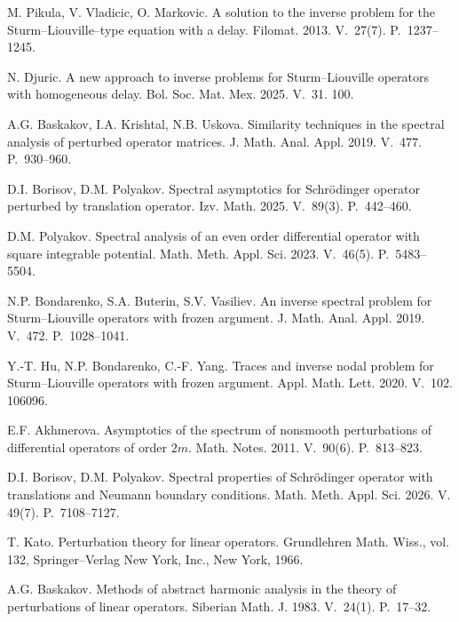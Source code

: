 \documentclass[11pt,centertags,reqno,twoside]{amsart}
\numberwithin{equation}{section}
\theoremstyle{definition}
\theoremstyle{remark}
\begin{document}
\begin{thebibliography}{}
M. Pikula, V. Vladicic, O. Markovic. A solution to the inverse problem for the
Sturm--Liouville--type equation with a delay. Filomat. 2013. V.~27(7). P.~1237--1245.

N. Djuric. A new approach to inverse problems for Sturm--Liouville operators with
homogeneous delay. Bol. Soc. Mat. Mex. 2025. V.~31. 100.

A.G. Baskakov, I.A. Krishtal, N.B. Uskova. Similarity techniques in the spectral
analysis of perturbed operator matrices. J. Math. Anal. Appl. 2019. V.~477. P.~930--960.

D.I. Borisov, D.M. Polyakov. Spectral asymptotics for Schr\"odinger operator
perturbed by translation operator. Izv. Math. 2025. V.~89(3). P.~442--460.

D.M. Polyakov. Spectral analysis of an even order differential operator with square
integrable potential. Math. Meth. Appl. Sci. 2023. V.~46(5). P.~5483--5504.

N.P. Bondarenko, S.A. Buterin, S.V. Vasiliev. An inverse spectral problem for
Sturm--Liouville operators with frozen argument. J. Math. Anal. Appl. 2019.
V.~472. P.~1028--1041.

Y.-T. Hu, N.P. Bondarenko, C.-F. Yang. Traces and inverse nodal problem for
Sturm--Liouville operators with frozen argument. Appl. Math. Lett. 2020. V.~102. 106096.

E.F. Akhmerova. Asymptotics of the spectrum of nonsmooth perturbations of
differential operators of order $2m$. Math. Notes. 2011. V.~90(6). P.~813--823.

D.I. Borisov, D.M. Polyakov. Spectral properties of Schr\"odinger operator with
translations and Neumann boundary conditions. Math. Meth. Appl. Sci. 2026.
V. 49(7). P.~7108--7127.

T. Kato. Perturbation theory for linear operators. Grundlehren Math. Wiss.,
vol. 132, Springer--Verlag New York, Inc., New York, 1966.

A.G. Baskakov. Methods of abstract harmonic analysis in the theory of perturbations of linear
operators. Siberian Math. J. 1983. V.~24(1). P.~17--32.
\end{thebibliography}
\end{document}
